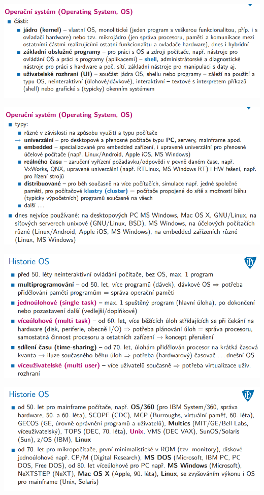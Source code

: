 \documentclass[10pt,a4paper]{article}
\begin{document}
\includegraphics[scale=0.65]{img/druhy_odstavec/os3.png}

\includegraphics[scale=0.65]{img/druhy_odstavec/os4.png}

\includegraphics[scale=0.65]{img/druhy_odstavec/os5.png}

\includegraphics[scale=0.65]{img/druhy_odstavec/os6.png}
\end{document}
